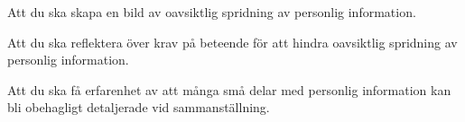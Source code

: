 \item Att du ska skapa en bild av oavsiktlig spridning av personlig 
information.
\item Att du ska reflektera över krav på beteende för att hindra oavsiktlig 
spridning av personlig information.
\item Att du ska få erfarenhet av att många små delar med personlig information 
kan bli obehagligt detaljerade vid sammanställning.
